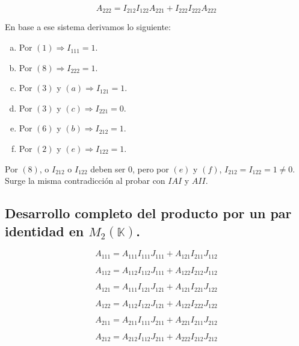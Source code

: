 \documentclass[a4paper, titlepage]{article}
\begin{document}
\begin{equation}
A_{222} = I_{212} I_{122} A_{221} + I_{222} I_{222} A_{222}
\end{equation}

En base a ese sistema derivamos lo siguiente:

\begin{enumerate}[(a)]
	\item Por $(1) \Rightarrow I_{111} = 1$.
	\item Por $(8) \Rightarrow I_{222} = 1$.
	\item Por $(3)$ y $(a) \Rightarrow I_{121} = 1$.
	\item Por $(3)$ y $(c) \Rightarrow I_{221} = 0$.
	\item Por $(6)$ y $(b) \Rightarrow I_{212} = 1$.
	\item Por $(2)$ y $(e) \Rightarrow I_{122} = 1$.
\end{enumerate}

Por $(8)$, o $I_{212}$ o $I_{122}$ deben ser $0$, pero por $(e)$ y $(f)$, $I_{212} = I_{122} = 1 \neq 0$. Surge la misma contradicción al probar con $IAI$ y $AII$.

\subsection{Desarrollo completo del producto por un par identidad en $M_2 (\mathbb{K})$.}

\begin{equation}
A_{111} = A_{111} I_{111} J_{111} + A_{121} I_{211} J_{112}
\end{equation}

\begin{equation}
A_{112} = A_{112} I_{112} J_{111} + A_{122} I_{212} J_{112}
\end{equation}

\begin{equation}
A_{121} = A_{111} I_{121} J_{121} + A_{121} I_{221} J_{122}
\end{equation}

\begin{equation}
A_{122} = A_{112} I_{122} J_{121} + A_{122} I_{222} J_{122}
\end{equation}

\begin{equation}
A_{211} = A_{211} I_{111} J_{211} + A_{221} I_{211} J_{212}
\end{equation}

\begin{equation}
A_{212} = A_{212} I_{112} J_{211} + A_{222} I_{212} J_{212}
\end{equation}
\end{document}
